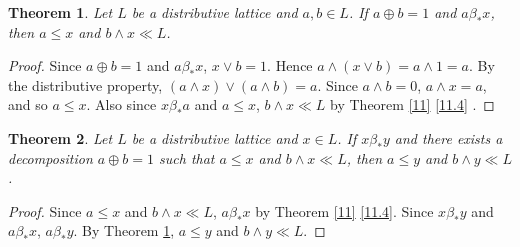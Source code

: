 \documentclass[11pt,reqno]{amsart} %
\theoremstyle{plain}
\newtheorem{theorem}{Theorem}
\theoremstyle{definition}
\theoremstyle{remark}
\numberwithin{equation}{section}
\begin{document}

\begin{theorem}\label{12}
  Let $ L $ be a distributive lattice and $ a,b \in L $. If $ a \oplus b = 1 $ and $ a \beta_* x $, 
  then $ a \leq x $ and $ b \wedge x \ll L $.
\end{theorem}
\begin{proof}
  Since $ a \oplus b = 1 $ and $ a \beta_* x $, $ x \vee b = 1 $. Hence $ a \wedge ( x \vee b ) = a \wedge 1 = a $. 
  By the distributive property, $ ( a \wedge x ) \vee ( a \wedge b ) = a $. Since $ a \wedge b = 0 $, 
  $ a \wedge x = a $, and so $ a \leq x $. Also since $ x \beta_* a $ and $ a \leq x $, 
  $ b \wedge x \ll L $ by Theorem \ref{11} \ref{11.4} .
\end{proof}


\begin{theorem}\label{13}
  Let $ L $ be a distributive lattice and $ x \in L $. If $ x \beta_* y $ and there exists a 
  decomposition $ a \oplus b = 1 $ such that $ a \leq x $ and $ b \wedge x \ll L $, then 
  $ a \leq y $ and $ b \wedge y \ll L $. 
  \end{theorem}
\begin{proof}
  Since $ a \leq x $ and $ b \wedge x \ll L $, $ a \beta_* x $ by Theorem \ref{11} \ref{11.4}. 
  Since $ x \beta_* y $ and $ a \beta_* x $, $ a \beta_* y $. 
  By Theorem \ref{12}, $ a \leq y $ and $ b \wedge y \ll L $.
\end{proof}

%
%
%
%
%
%
\end{document}
